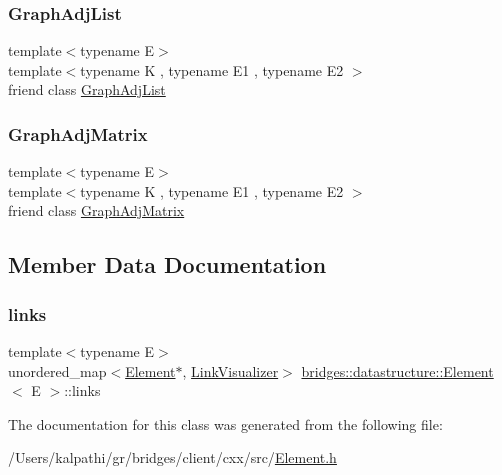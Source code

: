 \subsubsection{\texorpdfstring{Graph\+Adj\+List}{GraphAdjList}}
{\footnotesize\ttfamily template$<$typename E$>$ \\
template$<$typename K , typename E1 , typename E2 $>$ \\
friend class \mbox{\hyperlink{classbridges_1_1datastructure_1_1_graph_adj_list}{Graph\+Adj\+List}}\hspace{0.3cm}{\ttfamily [friend]}}

\mbox{\label{classbridges_1_1datastructure_1_1_element_a1935808473b7eb8ff54149c5436c3ac9}} 
\subsubsection{\texorpdfstring{Graph\+Adj\+Matrix}{GraphAdjMatrix}}
{\footnotesize\ttfamily template$<$typename E$>$ \\
template$<$typename K , typename E1 , typename E2 $>$ \\
friend class \mbox{\hyperlink{classbridges_1_1datastructure_1_1_graph_adj_matrix}{Graph\+Adj\+Matrix}}\hspace{0.3cm}{\ttfamily [friend]}}



\subsection{Member Data Documentation}
\mbox{\label{classbridges_1_1datastructure_1_1_element_ac296ae66e6b04e95f31f4134228524f8}} 
\subsubsection{\texorpdfstring{links}{links}}
{\footnotesize\ttfamily template$<$typename E$>$ \\
unordered\+\_\+map$<$\mbox{\hyperlink{classbridges_1_1datastructure_1_1_element}{Element}}$\ast$, \mbox{\hyperlink{classbridges_1_1datastructure_1_1_link_visualizer}{Link\+Visualizer}}$>$ \mbox{\hyperlink{classbridges_1_1datastructure_1_1_element}{bridges\+::datastructure\+::\+Element}}$<$ E $>$\+::links\hspace{0.3cm}{\ttfamily [protected]}}



The documentation for this class was generated from the following file\+:\begin{DoxyCompactItemize}
\item 
/\+Users/kalpathi/gr/bridges/client/cxx/src/\mbox{\hyperlink{_element_8h}{Element.\+h}}\end{DoxyCompactItemize}
